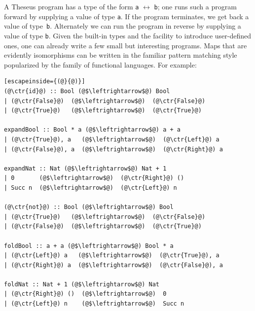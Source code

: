 \documentclass{article}
\newcommand{\ctr}[1]{{\scriptsize{\texttt{#1}}}}
\begin{document}
A Theseus program has a type of the form \ctr{a} $\leftrightarrow$ \ctr{b};
one runs such a program forward by supplying a value of type \ctr{a}. If the
program terminates, we get back a value of type~\ctr{b}. Alternately we can
run the program in reverse by supplying a value of type \ctr{b}. Given the
built-in types and the facility to introduce user-defined ones, one can
already write a few small but interesting programs. Maps that are evidently
isomorphisms can be written in the familiar pattern matching style
popularized by the family of functional languages. For example:
\begin{multicols}{2}
\begin{lstlisting}[escapeinside={(@}{@)}]
(@\ctr{id}@) :: Bool (@$\leftrightarrow$@) Bool
| (@\ctr{False}@)  (@$\leftrightarrow$@)  (@\ctr{False}@)
| (@\ctr{True}@)   (@$\leftrightarrow$@)  (@\ctr{True}@)

expandBool :: Bool * a (@$\leftrightarrow$@) a + a
| (@\ctr{True}@), a   (@$\leftrightarrow$@)  (@\ctr{Left}@) a
| (@\ctr{False}@), a  (@$\leftrightarrow$@)  (@\ctr{Right}@) a

expandNat :: Nat (@$\leftrightarrow$@) Nat + 1
| 0       (@$\leftrightarrow$@)  (@\ctr{Right}@) ()
| Succ n  (@$\leftrightarrow$@)  (@\ctr{Left}@) n

(@\ctr{not}@) :: Bool (@$\leftrightarrow$@) Bool
| (@\ctr{True}@)   (@$\leftrightarrow$@)  (@\ctr{False}@)
| (@\ctr{False}@)  (@$\leftrightarrow$@)  (@\ctr{True}@)

foldBool :: a + a (@$\leftrightarrow$@) Bool * a
| (@\ctr{Left}@) a   (@$\leftrightarrow$@)  (@\ctr{True}@), a
| (@\ctr{Right}@) a  (@$\leftrightarrow$@)  (@\ctr{False}@), a

foldNat :: Nat + 1 (@$\leftrightarrow$@) Nat
| (@\ctr{Right}@) ()  (@$\leftrightarrow$@)  0
| (@\ctr{Left}@) n    (@$\leftrightarrow$@)  Succ n
 \end{lstlisting}
\end{multicols}
\end{document}
